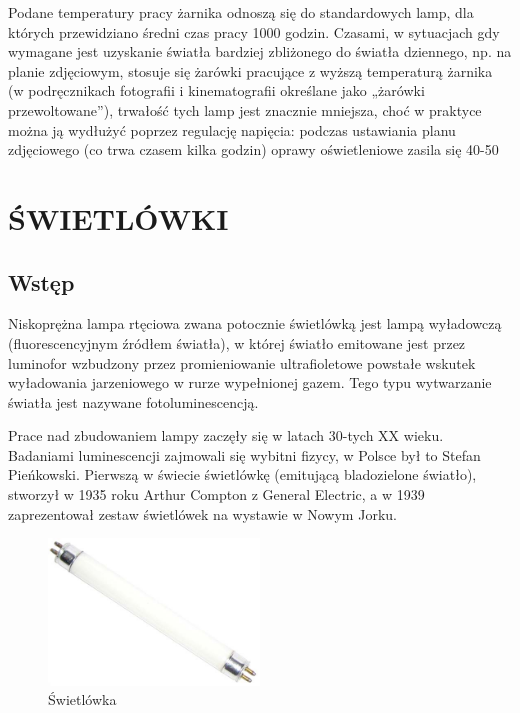 \documentclass[12pt,a4paper]{book}
\begin{document}
Podane temperatury pracy żarnika odnoszą się do standardowych lamp, dla których przewidziano średni czas pracy 1000 godzin. Czasami, w sytuacjach gdy wymagane jest uzyskanie światła bardziej zbliżonego do światła dziennego, np. na planie zdjęciowym, stosuje się żarówki pracujące z wyższą temperaturą żarnika (w podręcznikach fotografii i kinematografii określane jako „żarówki przewoltowane”), trwałość tych lamp jest znacznie mniejsza, choć w praktyce można ją wydłużyć poprzez regulację napięcia: podczas ustawiania planu zdjęciowego (co trwa czasem kilka godzin) oprawy oświetleniowe zasila się 40-50%

\chapter{ŚWIETLÓWKI}

\section*{Wstęp}

Niskoprężna lampa rtęciowa zwana potocznie świetlówką jest lampą wyładowczą (fluorescencyjnym źródłem światła), w której światło emitowane jest przez luminofor wzbudzony przez promieniowanie ultrafioletowe powstałe wskutek wyładowania jarzeniowego w rurze wypełnionej gazem. Tego typu wytwarzanie światła jest nazywane fotoluminescencją.

Prace nad zbudowaniem lampy zaczęły się w latach 30-tych XX wieku. Badaniami luminescencji zajmowali się wybitni fizycy, w Polsce był to Stefan Pieńkowski. Pierwszą w świecie świetlówkę (emitującą bladozielone światło), stworzył w 1935 roku Arthur Compton z General Electric, a w 1939 zaprezentował zestaw świetlówek na wystawie w Nowym Jorku.

\begin{figure}[ht]
  \centering
  \includegraphics[width=0.5\textwidth]{Rysunek3.jpg}
  \caption{Świetlówka}
  \label{Rys.1.1.}
\end{figure}
\end{document}
